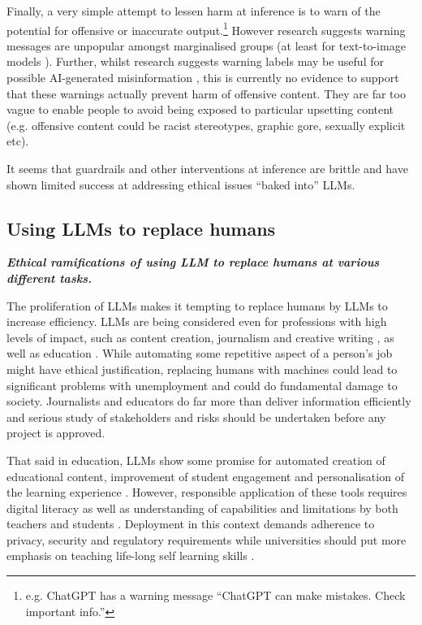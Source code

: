 Finally, a very simple attempt to lessen harm at inference is to warn of the potential for offensive or inaccurate output.\footnote{e.g. ChatGPT has a warning message ``ChatGPT can make mistakes. Check important info.''} However research suggests warning messages are unpopular amongst marginalised groups (at least for text-to-image models \cite{ungless_stereotypes_2023}). Further, whilst research suggests warning labels may be useful for possible AI-generated misinformation \citep{wittenberg_labeling_2024}, this is currently no evidence to support that these warnings actually prevent harm of offensive content. They are far too vague to enable people to avoid being exposed to particular upsetting content (e.g. offensive content could be racist stereotypes, graphic gore, sexually explicit etc).

It seems that guardrails and other interventions at inference are brittle and have shown limited success at addressing ethical issues ``baked into'' LLMs.

\subsection{Using LLMs to replace humans}\label{sec:replacehumans}\noindent\textbf{\textit{Ethical ramifications of using LLM to replace humans at various different tasks.}}
\newline 

\noindent The proliferation of LLMs makes it tempting to replace humans by LLMs to increase efficiency. LLMs are being considered even for professions with high levels of impact, such as content creation, journalism and creative writing \cite{wga_negotiating_comittee_wga_2023}, as well as education \cite{walczak2023challenges, kasneci2023chatgpt, sok2023chatgpt}. While automating some repetitive aspect of a person's job might have ethical justification, replacing humans with machines could lead to significant problems with unemployment and could do fundamental damage to society. Journalists and educators do far more than deliver information efficiently and serious study of stakeholders and risks should be undertaken before any project is approved.   

That said in education, LLMs show some promise for automated creation of educational content, improvement of student engagement and personalisation of the learning experience \cite{kasneci2023chatgpt}. However, responsible application of these tools requires digital literacy as well as understanding of capabilities and limitations by both teachers and students \cite{walczak2023challenges, kasneci2023chatgpt}. Deployment in this context demands adherence to privacy, security and regulatory requirements \cite{kasneci2023chatgpt} while universities should put more emphasis on teaching life-long self learning skills \cite{walczak2023challenges}.

